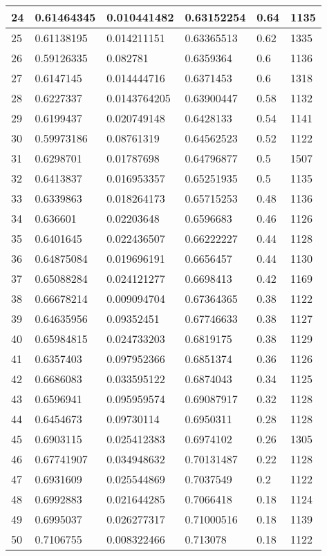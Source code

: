 \begin{longtable}{|l|l|l|l|l|l|}
24 & 0.61464345 & 0.010441482 & 0.63152254 & 0.64 & 1135 \\ \hline 
25 & 0.61138195 & 0.014211151 & 0.63365513 & 0.62 & 1335 \\ \hline 
26 & 0.59126335 & 0.082781 & 0.6359364 & 0.6 & 1136 \\ \hline 
27 & 0.6147145 & 0.014444716 & 0.6371453 & 0.6 & 1318 \\ \hline 
28 & 0.6227337 & 0.0143764205 & 0.63900447 & 0.58 & 1132 \\ \hline 
29 & 0.6199437 & 0.020749148 & 0.6428133 & 0.54 & 1141 \\ \hline 
30 & 0.59973186 & 0.08761319 & 0.64562523 & 0.52 & 1122 \\ \hline 
31 & 0.6298701 & 0.01787698 & 0.64796877 & 0.5 & 1507 \\ \hline 
32 & 0.6413837 & 0.016953357 & 0.65251935 & 0.5 & 1135 \\ \hline 
33 & 0.6339863 & 0.018264173 & 0.65715253 & 0.48 & 1136 \\ \hline 
34 & 0.636601 & 0.02203648 & 0.6596683 & 0.46 & 1126 \\ \hline 
35 & 0.6401645 & 0.022436507 & 0.66222227 & 0.44 & 1128 \\ \hline 
36 & 0.64875084 & 0.019696191 & 0.6656457 & 0.44 & 1130 \\ \hline 
37 & 0.65088284 & 0.024121277 & 0.6698413 & 0.42 & 1169 \\ \hline 
38 & 0.66678214 & 0.009094704 & 0.67364365 & 0.38 & 1122 \\ \hline 
39 & 0.64635956 & 0.09352451 & 0.67746633 & 0.38 & 1127 \\ \hline 
40 & 0.65984815 & 0.024733203 & 0.6819175 & 0.38 & 1129 \\ \hline 
41 & 0.6357403 & 0.097952366 & 0.6851374 & 0.36 & 1126 \\ \hline 
42 & 0.6686083 & 0.033595122 & 0.6874043 & 0.34 & 1125 \\ \hline 
43 & 0.6596941 & 0.095959574 & 0.69087917 & 0.32 & 1128 \\ \hline 
44 & 0.6454673 & 0.09730114 & 0.6950311 & 0.28 & 1128 \\ \hline 
45 & 0.6903115 & 0.025412383 & 0.6974102 & 0.26 & 1305 \\ \hline 
46 & 0.67741907 & 0.034948632 & 0.70131487 & 0.22 & 1128 \\ \hline 
47 & 0.6931609 & 0.025544869 & 0.7037549 & 0.2 & 1122 \\ \hline 
48 & 0.6992883 & 0.021644285 & 0.7066418 & 0.18 & 1124 \\ \hline 
49 & 0.6995037 & 0.026277317 & 0.71000516 & 0.18 & 1139 \\ \hline 
50 & 0.7106755 & 0.008322466 & 0.713078 & 0.18 & 1122 \\ \hline 
\end{longtable}
